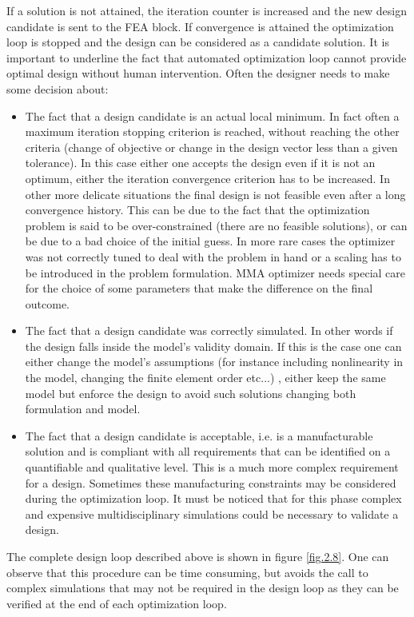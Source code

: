 If a solution is not attained, the iteration counter is increased and the new design candidate is sent to the FEA block.
If convergence is attained the optimization loop is stopped and the design can be considered as a candidate solution. It is important to underline the fact that automated optimization loop cannot provide optimal design without human intervention. 
Often the designer needs to make some decision about:
\begin{itemize}
\item The fact that a design candidate is an actual local minimum. In fact often a maximum iteration stopping criterion is reached, without reaching the other criteria (change of objective or change in the design vector less than a given tolerance). In this case either one accepts the design even if it is not an optimum, either the iteration convergence criterion has to be increased. In other more delicate situations the final design is not feasible even after a long convergence history. This can be due to the fact that the optimization problem is said to be over-constrained (there are no feasible solutions), or can be due to a bad choice of the initial guess. In more rare cases the optimizer was not correctly tuned to deal with the problem in hand or a scaling has to be introduced in the problem formulation. MMA optimizer needs special care for the choice of some parameters that make the difference on the final outcome.
\item The fact that a design candidate was correctly simulated. In other words if the design falls inside the model's validity domain. If this is the case one can either change the model's assumptions (for instance including nonlinearity in the model, changing the finite element order etc...) , either keep the same model but enforce the design to avoid such solutions changing both formulation and model. 
\item The fact that a design candidate is acceptable, i.e. is a manufacturable solution and is compliant with all requirements that can be identified on a quantifiable and qualitative level. This is a much more complex requirement for a design. Sometimes these manufacturing constraints may be considered during the optimization loop. It must be noticed that for this phase complex and expensive multidisciplinary simulations could be necessary to validate a design. 
\end{itemize}
The complete design loop described above is shown in figure \ref{fig.2.8}. One can observe that this procedure can be time consuming, but avoids the call to complex simulations that may not be required in the design loop as they  can be verified at the end of each optimization loop.
